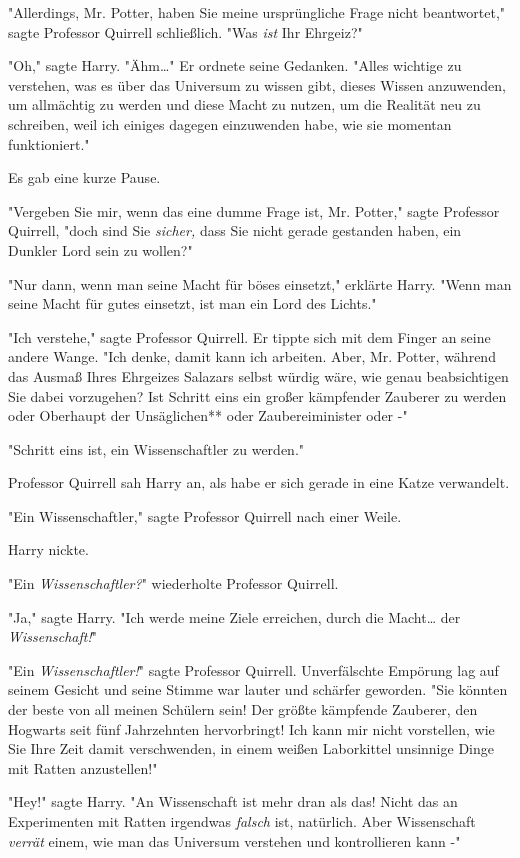 {"Allerdings, Mr. Potter, haben Sie meine ursprüngliche Frage nicht beantwortet," sagte Professor Quirrell schließlich. "Was \emph{ist} Ihr Ehrgeiz?"

"Oh," sagte Harry. "Ähm…" Er ordnete seine Gedanken. "Alles wichtige zu verstehen, was es über das Universum zu wissen gibt, dieses Wissen anzuwenden, um allmächtig zu werden und diese Macht zu nutzen, um die Realität neu zu schreiben, weil ich einiges dagegen einzuwenden habe, wie sie momentan funktioniert."

Es gab eine kurze Pause.

"Vergeben Sie mir, wenn das eine dumme Frage ist, Mr. Potter," sagte Professor Quirrell, "doch sind Sie \emph{sicher,} dass Sie nicht gerade gestanden haben, ein Dunkler Lord sein zu wollen?"

"Nur dann, wenn man seine Macht für böses einsetzt," erklärte Harry. "Wenn man seine Macht für gutes einsetzt, ist man ein Lord des Lichts."

"Ich verstehe," sagte Professor Quirrell. Er tippte sich mit dem Finger an seine andere Wange. "Ich denke, damit kann ich arbeiten. Aber, Mr. Potter, während das Ausmaß Ihres Ehrgeizes Salazars selbst würdig wäre, wie genau beabsichtigen Sie dabei vorzugehen? Ist Schritt eins ein großer kämpfender Zauberer zu werden oder Oberhaupt der Unsäglichen** oder Zaubereiminister oder -"

"Schritt eins ist, ein Wissenschaftler zu werden."

Professor Quirrell sah Harry an, als habe er sich gerade in eine Katze verwandelt.

"Ein Wissenschaftler," sagte Professor Quirrell nach einer Weile.

Harry nickte.

"Ein \emph{Wissenschaftler?}" wiederholte Professor Quirrell.

"Ja," sagte Harry. "Ich werde meine Ziele erreichen, durch die Macht… der \emph{Wissenschaft!}"

"Ein \emph{Wissenschaftler!}" sagte Professor Quirrell. Unverfälschte Empörung lag auf seinem Gesicht und seine Stimme war lauter und schärfer geworden. "Sie könnten der beste von all meinen Schülern sein! Der größte kämpfende Zauberer, den Hogwarts seit fünf Jahrzehnten hervorbringt! Ich kann mir nicht vorstellen, wie Sie Ihre Zeit damit verschwenden, in einem weißen Laborkittel unsinnige Dinge mit Ratten anzustellen!"

"Hey!" sagte Harry. "An Wissenschaft ist mehr dran als das! Nicht das an Experimenten mit Ratten irgendwas \emph{falsch} ist, natürlich. Aber Wissenschaft \emph{verrät} einem, wie man das Universum verstehen und kontrollieren kann -"

}

